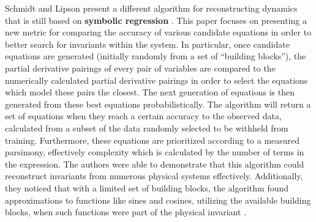 \documentclass[10pt]{paper}
\begin{document}
Schmidt and Lipson present a different algorithm for reconstructing dynamics that is still based on \textbf{symbolic regression} \cite{schmidt}. This paper focuses on presenting a new metric for comparing the accuracy of various candidate equations in order to better search for invariants within the system. In particular, once candidate equations are generated (initially randomly from a set of ``building blocks''), the partial derivative pairings of every pair of variables are compared to the numerically calculated partial derivative pairings in order to select the equations which model these pairs the closest. The next generation of equations is then generated from these best equations probabilistically. The algorithm will return a set of equations when they reach a certain accuracy to the observed data, calculated from a subset of the data randomly selected to be withheld from training. 
Furthermore, these equations are prioritized according to a measured parsimony, effectively complexity which is calculated by the number of terms in the expression. The authors were able to demonstrate that this algorithm could reconstruct invariants from numerous physical systems effectively. Additionally, they noticed that with a limited set of building blocks, the algorithm found approximations to functions like sines and cosines, utilizing the available building blocks, when such functions were part of the physical invariant \cite{schmidt}. 


\end{document}
